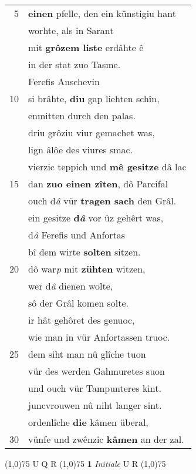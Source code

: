 \documentclass[8pt,a4paper,notitlepage]{article}
\begin{document}
\begin{table}[ht]
\begin{minipage}[t]{0.5\linewidth}
\begin{tabular}{rl}
5 & \textbf{einen} pfelle, den ein künstigiu hant\\ 
 & worhte, als in Sarant\\ 
 & mit \textbf{grôzem liste} erdâhte ê\\ 
 & in der stat zuo Tasme.\\ 
 & Ferefis Anschevin\\ 
10 & si brâhte, \textbf{diu} gap liehten schîn,\\ 
 & enmitten durch den palas.\\ 
 & driu grôziu viur gemachet was,\\ 
 & lign âlôe des viures smac.\\ 
 & vierzic teppich und \textbf{mê gesitze} dâ lac\\ 
15 & dan \textbf{zuo einen zîten}, dô Parcifal\\ 
 & ouch d\textit{â} vür \textbf{tragen sach} den Grâl.\\ 
 & ein gesitze \textbf{d\textit{â}} vor ûz gehêrt was,\\ 
 & d\textit{â} Ferefis und Anfortas\\ 
 & bî dem wirte \textbf{solten} sitzen.\\ 
20 & dô war\textit{p} mit \textbf{zühten} witzen,\\ 
 & wer d\textit{â} dienen wolte,\\ 
 & sô der Grâl komen solte.\\ 
 & ir hât gehôret des genuoc,\\ 
 & wie man in vür Anfortassen truoc.\\ 
25 & dem siht man nû glîche tuon\\ 
 & vür des werden Gahmuretes suon\\ 
 & und ouch vür Tampunteres kint.\\ 
 & juncvrouwen nû niht langer sint.\\ 
 & ordenlîche \textbf{die} kâmen überal,\\ 
30 & vünfe und zwênzic \textbf{kâmen} an der zal.\\ 
\end{tabular}
\scriptsize
\line(1,0){75} \newline
U Q R \newline
\line(1,0){75} \newline
\textbf{1} \textit{Initiale} U R  \newline
\line(1,0){75} \newline

\end{minipage}
\end{table}
\end{document}
